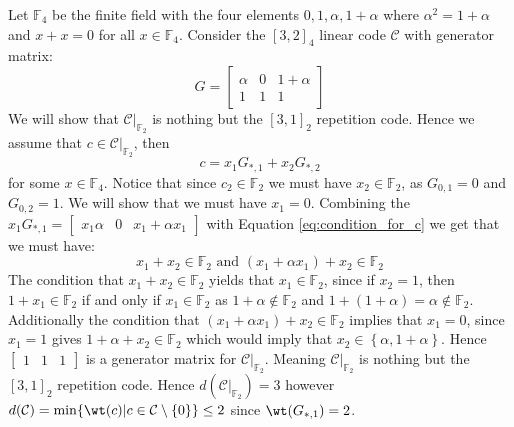 \begin{example}\label{exmp:reduction_to_repr}
  Let $\mathbb{F}_{4}$ be the finite field with the four elements $0, 1, \alpha, 1 + \alpha$ where $\alpha^{2} = 1 + \alpha$ and $x + x = 0$ for all $x \in \mathbb{F}_4$. Consider the $[3, 2]_{4}$ linear code $\mathcal{C}$ with generator matrix:
  \begin{equation*}
    G = \begin{bmatrix}
          \alpha & 0 & 1 + \alpha \\
          1 & 1 & 1
        \end{bmatrix}
  \end{equation*}
  We will show that $\mathcal{C} \vert_{\mathbb{F}_2}$ is nothing but the $[3, 1]_2$ repetition code. Hence we assume that $c \in \mathcal{C} \vert_{\mathbb{F}_2}$, then
  \begin{equation}\label{eq:condition_for_c}
    c = x_1 G_{*, 1} + x_2 G_{*, 2}
  \end{equation}
  for some $x \in \mathbb{F}_4$. Notice that since $c_2 \in \mathbb{F}_2$ we must have $x_2 \in \mathbb{F}_2$, as $G_{0, 1} = 0$ and $G_{0, 2} = 1$. We will show that we must have $x_1 = 0$. Combining the $x_1 G_{*, 1} = \begin{bmatrix}
                      x_1 \alpha & 0 & x_1 + \alpha x_{1}
                   \end{bmatrix}$
  with Equation \ref{eq:condition_for_c} we get that we must have:
  \begin{equation*}
    x_1 + x_2 \in \mathbb{F}_2 \text{ and }  (x_1 + \alpha x_1) + x_2 \in \mathbb{F}_2
  \end{equation*}
  The condition that $x_1 + x_2 \in \mathbb{F}_2$ yields that $x_1 \in \mathbb{F}_2$, since if $x_2 = 1$, then $1 + x_1 \in \mathbb{F}_2$ if and only if $x_1 \in \mathbb{F}_2$ as $1 + \alpha \not \in \mathbb{F}_2$ and $1 + (1 + \alpha) = \alpha \not \in \mathbb{F}_2$. Additionally the condition that $(x_1 + \alpha x_1) + x_2 \in \mathbb{F}_2$ implies that $x_1 = 0$, since $x_{1} = 1$ gives $1 + \alpha + x_2 \in \mathbb{F}_2$ which would imply that $x_2 \in \left\{\alpha, 1 + \alpha \right\}$. Hence $\begin{bmatrix} 1 &  1 & 1 \end{bmatrix}$ is a generator matrix for  $\mathcal{C} \vert_{\mathbb{F}_2}$. Meaning $\mathcal{C} \vert_{\mathbb{F}_2}$ is nothing but the $[3, 1]_2$ repetition code. Hence $d(\mathcal{C} \vert_{\mathbb{F}_2}) = 3$ however $d(\mathcal{C}) = \min\{\wt(c) \vert c \in \mathcal{C} \setminus \left\{0\right\}\} \leq 2$ since $\wt(G_{*, 1}) = 2$.
\end{example}

